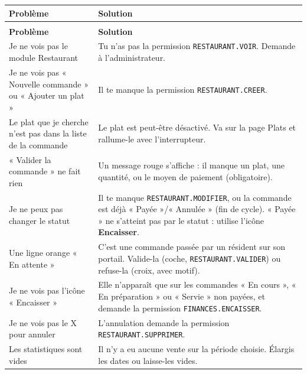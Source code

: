\documentclass[12pt,a4paper]{article}
\begin{document}
\begin{longtable}{>{\raggedright}p{5cm} p{9cm}}
\toprule
\textbf{Problème} & \textbf{Solution} \\
\midrule
\endfirsthead
\multicolumn{2}{c}{\textit{Suite de la FAQ}} \\
\toprule
\textbf{Problème} & \textbf{Solution} \\
\midrule
\endhead
\bottomrule
\endfoot

Je ne vois pas le module Restaurant & Tu n'as pas la permission \texttt{RESTAURANT.VOIR}. Demande à l'administrateur. \\

Je ne vois pas « Nouvelle commande » ou « Ajouter un plat » & Il te manque la permission \texttt{RESTAURANT.CREER}. \\

Le plat que je cherche n'est pas dans la liste de la commande & Le plat est peut-être désactivé. Va sur la page Plats et rallume-le avec l'interrupteur. \\

« Valider la commande » ne fait rien & Un message rouge s'affiche : il manque un plat, une quantité, ou le moyen de paiement (obligatoire). \\

Je ne peux pas changer le statut & Il te manque \texttt{RESTAURANT.MODIFIER}, ou la commande est déjà « Payée »/« Annulée » (fin de cycle). « Payée » ne s'atteint pas par le statut : utilise l'icône \textbf{Encaisser}. \\

Une ligne orange « En attente » & C'est une commande passée par un résident sur son portail. Valide-la (coche, \texttt{RESTAURANT.VALIDER}) ou refuse-la (croix, avec motif). \\

Je ne vois pas l'icône « Encaisser » & Elle n'apparaît que sur les commandes « En cours », « En préparation » ou « Servie » non payées, et demande la permission \texttt{FINANCES.ENCAISSER}. \\

Je ne vois pas le X pour annuler & L'annulation demande la permission \texttt{RESTAURANT.SUPPRIMER}. \\

Les statistiques sont vides & Il n'y a eu aucune vente sur la période choisie. Élargis les dates ou laisse-les vides. \\

\bottomrule
\end{longtable}
\end{document}
